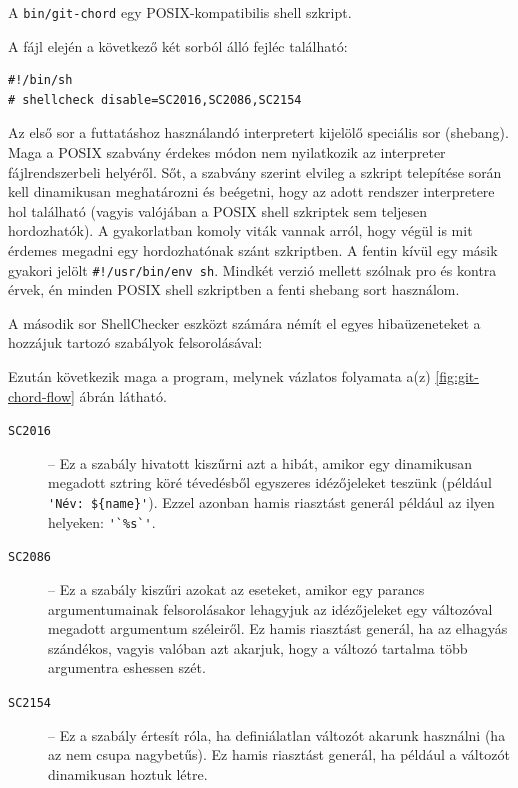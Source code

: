 \documentclass[
]{elteikthesis}[2025/03/25]
\begin{document}

A \verb|bin/git-chord| egy POSIX-kompatibilis shell szkript.

A fájl elején a következő két sorból álló fejléc található:

\begin{verbatim}
#!/bin/sh
# shellcheck disable=SC2016,SC2086,SC2154
\end{verbatim}

Az első sor a futtatáshoz használandó interpretert kijelölő speciális sor (shebang).
Maga a POSIX szabvány érdekes módon nem nyilatkozik az interpreter fájlrendszerbeli helyéről.
Sőt, a szabvány szerint elvileg a szkript telepítése során kell dinamikusan meghatározni és beégetni,
hogy az adott rendszer interpretere hol található
(vagyis valójában a POSIX shell szkriptek sem teljesen hordozhatók).
A gyakorlatban komoly viták vannak arról,
hogy végül is mit érdemes megadni egy hordozhatónak szánt szkriptben.
A fentin kívül egy másik gyakori jelölt \verb|#!/usr/bin/env sh|.
Mindkét verzió mellett szólnak pro és kontra érvek,
én minden POSIX shell szkriptben a fenti shebang sort használom.

A második sor ShellChecker eszközt számára némít el egyes hibaüzeneteket
a hozzájuk tartozó szabályok felsorolásával:

Ezután következik maga a program,
melynek vázlatos folyamata a(z) \ref{fig:git-chord-flow} ábrán látható.

\begin{description}
    \item[\texttt{SC2016}] --
        Ez a szabály hivatott kiszűrni azt a hibát, amikor egy dinamikusan megadott sztring köré
        tévedésből egyszeres idézőjeleket teszünk
        (például \verb|'Név: ${name}'|).
        Ezzel azonban hamis riasztást generál például az ilyen helyeken: \verb|'`%s`'|.
    \item[\texttt{SC2086}] --
        Ez a szabály kiszűri azokat az eseteket, amikor egy parancs argumentumainak felsorolásakor
        lehagyjuk az idézőjeleket egy változóval megadott argumentum széleiről.
        Ez hamis riasztást generál, ha az elhagyás szándékos,
        vagyis valóban azt akarjuk, hogy a változó tartalma több argumentra eshessen szét.
    \item[\texttt{SC2154}] --
        Ez a szabály értesít róla, ha definiálatlan változót akarunk használni (ha az nem csupa nagybetűs).
        Ez hamis riasztást generál, ha például a változót dinamikusan hoztuk létre.
\end{description}
\end{document}
